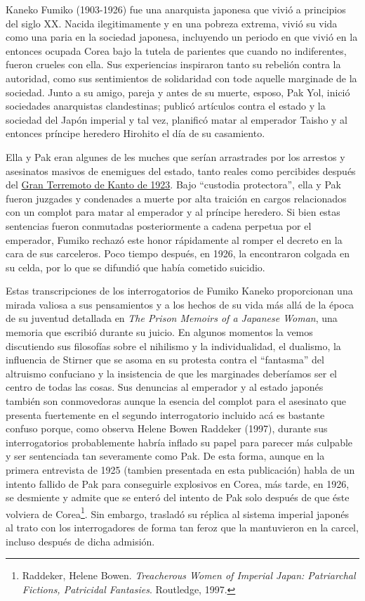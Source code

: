 \documentclass[
]{book}
\begin{document}
Kaneko Fumiko (1903-1926) fue una anarquista japonesa que vivió a principios del siglo XX. Nacida ilegitimamente y en una pobreza extrema, vivió su vida como una paria en la sociedad japonesa, incluyendo un periodo en que vivió en la entonces ocupada Corea bajo la tutela de parientes que cuando no indiferentes, fueron crueles con ella. Sus experiencias inspiraron tanto su rebelión contra la autoridad, como sus sentimientos de solidaridad con tode aquelle marginade de la sociedad. Junto a su amigo, pareja y antes de su muerte, esposo, Pak Yol, inició sociedades anarquistas clandestinas; publicó artículos contra el estado y la sociedad del Japón imperial y tal vez, planificó matar al emperador Taisho y al entonces príncipe heredero Hirohito el día de su casamiento.

Ella y Pak eran algunes de les muches que serían arrastrades por los arrestos y asesinatos masivos de enemigues del estado, tanto reales como percibides después del \href{https://es.wikipedia.org/wiki/Gran_terremoto_de_Kant\%C5\%8D}{Gran Terremoto de Kanto de 1923}. Bajo ``custodia protectora'', ella y Pak fueron juzgades y condenades a muerte por alta traición en cargos relacionados con un complot para matar al emperador y al príncipe heredero. Si bien estas sentencias fueron conmutadas posteriormente a cadena perpetua por el emperador, Fumiko rechazó este honor rápidamente al romper el decreto en la cara de sus carceleros. Poco tiempo después, en 1926, la encontraron colgada en su celda, por lo que se difundió que había cometido suicidio.

Estas transcripciones de los interrogatorios de Fumiko Kaneko proporcionan una mirada valiosa a sus pensamientos y a los hechos de su vida más allá de la época de su juventud detallada en \emph{The Prison Memoirs of a Japanese Woman}, una memoria que escribió durante su juicio. En algunos momentos la vemos discutiendo sus filosofías sobre el nihilismo y la individualidad, el dualismo, la influencia de Stirner que se asoma en su protesta contra el ``fantasma'' del altruismo confuciano y la insistencia de que les marginades deberíamos ser el centro de todas las cosas. Sus denuncias al emperador y al estado japonés también son conmovedoras aunque la esencia del complot para el asesinato que presenta fuertemente en el segundo interrogatorio incluido acá es bastante confuso porque, como observa Helene Bowen Raddeker (1997), durante sus interrogatorios probablemente habría inflado su papel para parecer más culpable y ser sentenciada tan severamente como Pak. De esta forma, aunque en la primera entrevista de 1925 (tambien presentada en esta publicación) habla de un intento fallido de Pak para conseguirle explosivos en Corea, más tarde, en 1926, se desmiente y admite que se enteró del intento de Pak solo después de que éste volviera de Corea\footnote{Raddeker, Helene Bowen. \emph{Treacherous Women of Imperial Japan: Patriarchal Fictions, Patricidal Fantasies}. Routledge, 1997.}. Sin embargo, trasladó su réplica al sistema imperial japonés al trato con los interrogadores de forma tan feroz que la mantuvieron en la carcel, incluso después de dicha admisión.
\end{document}
